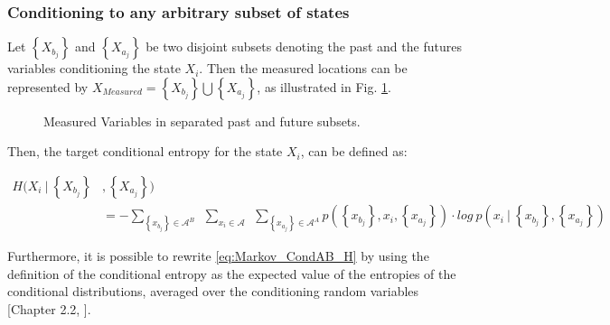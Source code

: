 \subsubsection{Conditioning to any arbitrary subset of states}

Let $\left\{X_{b_{j}}\right\}$ and $\left\{X_{a_{j}}\right\}$ be two disjoint subsets denoting the past and the futures variables conditioning the state $X_{i}$. Then the measured locations can be represented by $X_{Measured}  =  \left\{X_{b_{j}}\right\} \bigcup \left\{X_{a_{j}}\right\}$, as illustrated in Fig. \ref{fig:1DmodelArray_BA_Subsets}.



\begin{figure}[H]
		\centering
{}
\caption{Measured Variables in separated past and future subsets.}
\label{fig:1DmodelArray_BA_Subsets}
\end{figure} 

Then, the target conditional entropy for the state $X_{i}$, can be defined as:
                   
\begin{align}
\label{eq:Markov_CondAB_H}
	H(X_{i} \ | \ \left\{X_{b_{j}}\right\} & , \left\{X_{a_{j}}\right\}) \nonumber \\
	&= - \sum_{  \left\{x_{b_{j}}\right\} \in \mathcal{A}^{B}  }{ \ \ \sum_{ x_{i} \in \mathcal{A} }{ \ \ \sum_{  \left\{x_{a_{j}}\right\} \in \mathcal{A}^{A}      }{ p(\left\{x_{b_{j}}\right\} , x_{i}, \left\{x_{a_{j}}\right\}) \cdot log \ p(x_{i} \ | \ \left\{x_{b_{j}}\right\} , \left\{x_{a_{j}}\right\})   }}}
\end{align}

Furthermore, it is possible to rewrite 
\eqref{eq:Markov_CondAB_H} by using the definition of the conditional entropy as the expected value of the entropies of the conditional distributions, averaged over the conditioning random variables [Chapter 2.2, \cite{cover_2006}].



